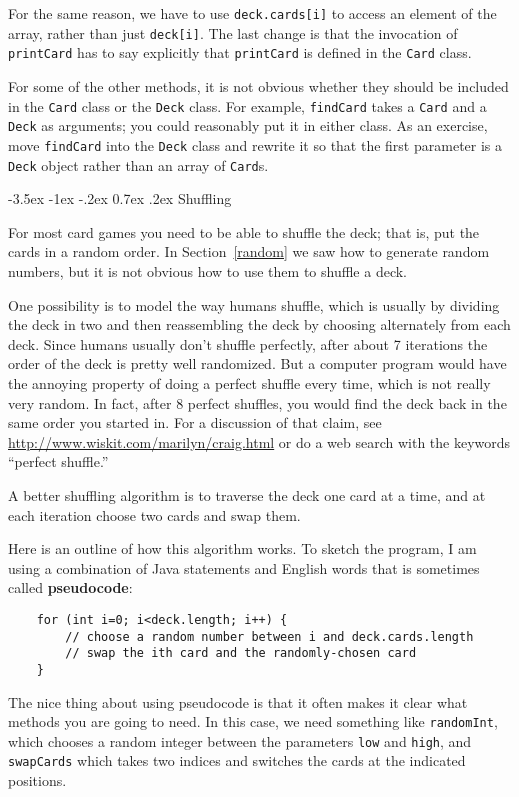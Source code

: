 \documentclass{book}
\makeatletter
\renewcommand{\section}{\@startsection 
    {section} {1} {0mm}%
    {-3.5ex \@plus -1ex \@minus -.2ex}%
    {0.7ex \@plus.2ex}%
    {\normalfont\Large\bfseries}}
\makeatother
\begin{document}
For the same reason, we have to use {\tt deck.cards[i]} to access an
element of the array, rather than just {\tt deck[i]}.  The last change
is that the invocation of {\tt printCard} has to say explicitly that
{\tt printCard} is defined in the {\tt Card} class.

For some of the other methods, it is not obvious whether they should
be included in the {\tt Card} class or the {\tt Deck} class.  For
example, {\tt findCard} takes a {\tt Card} and a {\tt Deck} as
arguments; you could reasonably put it in either class.  As an
exercise, move {\tt findCard} into the {\tt Deck} class and rewrite it
so that the first parameter is a {\tt Deck} object rather than an
array of {\tt Card}s.


\section{Shuffling}
\label{shuffle}

For most card games you need to be able to shuffle the deck;
that is, put the cards in a random order.  In Section~\ref{random}
we saw how to generate random numbers, but it is not obvious how
to use them to shuffle a deck.

One possibility is to model the way humans shuffle, which is usually
by dividing the deck in two and then reassembling the deck by choosing
alternately from each deck.  Since humans usually don't shuffle
perfectly, after about 7 iterations the order of the deck is pretty
well randomized.  But a computer program would have the annoying
property of doing a perfect shuffle every time, which is not really
very random.  In fact, after 8 perfect shuffles, you would find the
deck back in the same order you started in.  For a discussion of that
claim, see \url{http://www.wiskit.com/marilyn/craig.html} or do a web
search with the keywords ``perfect shuffle.''

A better shuffling algorithm is to traverse the deck one card at a
time, and at each iteration choose two cards and swap them.


Here is an outline of how this algorithm works.  To sketch the
program, I am using a combination of Java statements and English
words that is sometimes called {\bf pseudocode}:

\begin{verbatim}
    for (int i=0; i<deck.length; i++) {
        // choose a random number between i and deck.cards.length
        // swap the ith card and the randomly-chosen card
    }
\end{verbatim}
%
The nice thing about using pseudocode is that it often makes it
clear what methods you are going to need.  In this case, we
need something like {\tt randomInt}, which chooses a random
integer between the parameters {\tt low} and {\tt high},
and {\tt swapCards} which takes two indices and switches the
cards at the indicated positions.
\end{document}
